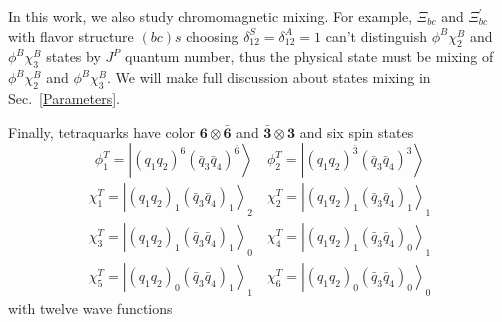 \documentclass[prd,twocolumn,floatfix,nofootinbib]{revtex4}
\begin{document}
In this work, we also study chromomagnetic mixing. 
For example, $\Xi_{bc}$ and $\Xi_{bc}^{\prime}$ with flavor structure $(bc)s$ choosing $\delta_{12}^{S}=\delta_{12}^{A}=1$ can't distinguish $\phi^{B}\chi_{2}^{B}$ and $\phi^{B}\chi_{3}^{B}$ states by $J^{P}$ quantum number, 
thus the physical state must be mixing of $\phi^{B}\chi_{2}^{B}$ and $\phi^{B}\chi_{3}^{B}$.
We will make full discussion about states mixing in Sec.~\ref{Parameters}.

Finally, tetraquarks have color $\boldsymbol{6}\otimes\boldsymbol{\bar{6}}$ and $\boldsymbol{\bar{3}}\otimes\boldsymbol{3}$ and six spin states
\begin{equation}\label{colorT}
    \phi_{1}^{T}=\left| {\left(q_{1}q_{2}\right)}^{6} {\left(\bar{q}_{3}\bar{q}_{4}\right)}^{\bar{6}} \right\rangle \quad
    \phi_{2}^{T}=\left| {\left(q_{1}q_{2}\right)}^{\bar{3}} {\left(\bar{q}_{3}\bar{q}_{4}\right)}^{3} \right\rangle
\end{equation}
\begin{equation}\label{spinT}
    \begin{aligned}
        \chi_{1}^{T}={\left| {\left(q_{1}q_{2}\right)}_{1} {\left(\bar{q}_{3}\bar{q}_{4}\right)}_{1} \right\rangle}_{2} \quad
        \chi_{2}^{T}={\left| {\left(q_{1}q_{2}\right)}_{1} {\left(\bar{q}_{3}\bar{q}_{4}\right)}_{1} \right\rangle}_{1} \\
        \chi_{3}^{T}={\left| {\left(q_{1}q_{2}\right)}_{1} {\left(\bar{q}_{3}\bar{q}_{4}\right)}_{1} \right\rangle}_{0} \quad
        \chi_{4}^{T}={\left| {\left(q_{1}q_{2}\right)}_{1} {\left(\bar{q}_{3}\bar{q}_{4}\right)}_{0} \right\rangle}_{1} \\
        \chi_{5}^{T}={\left| {\left(q_{1}q_{2}\right)}_{0} {\left(\bar{q}_{3}\bar{q}_{4}\right)}_{1} \right\rangle}_{1} \quad
        \chi_{6}^{T}={\left| {\left(q_{1}q_{2}\right)}_{0} {\left(\bar{q}_{3}\bar{q}_{4}\right)}_{0} \right\rangle}_{0}
    \end{aligned}
\end{equation}
with twelve wave functions
\end{document}
